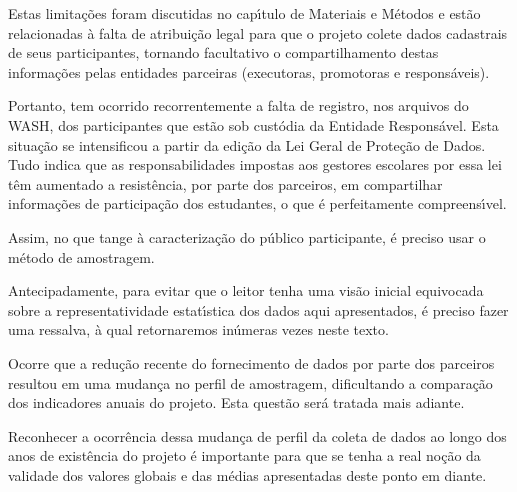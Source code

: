 \documentclass[
12pt,		%
openright,	%
twoside,  %
a4paper,			%
chapter=TITLE,		%
english,			%
french,				%
spanish,			%
brazil				%
]{USPSC-classe/USPSC}
\begin{document}
Estas limita\c{c}\~oes foram discutidas no cap\'{\i}tulo de Materiais e M\'etodos e est\~ao relacionadas \`a falta de atribui\c{c}\~ao legal para que o projeto colete dados cadastrais de seus participantes, tornando facultativo o compartilhamento destas informa\c{c}\~oes pelas entidades parceiras (executoras, promotoras e respons\'aveis).









Portanto, tem ocorrido recorrentemente a falta de registro, nos arquivos do WASH, dos participantes que est\~ao sob cust\'odia da Entidade Respons\'avel. Esta situa\c{c}\~ao se intensificou a partir da edi\c{c}\~ao da Lei Geral de Prote\c{c}\~ao de Dados. Tudo indica que as responsabilidades impostas aos gestores escolares por essa lei t\^em aumentado a  resist\^encia, por parte dos parceiros, em compartilhar informa\c{c}\~oes de participa\c{c}\~ao dos estudantes, o que \'e perfeitamente compreens\'{\i}vel.









Assim, no que tange \`a caracteriza\c{c}\~ao do p\'ublico participante, \'e preciso usar o m\'etodo de amostragem.









Antecipadamente, para evitar que o leitor tenha uma vis\~ao inicial equivocada sobre a representatividade estat\'{\i}stica dos dados aqui apresentados, \'e preciso fazer uma ressalva, \`a qual retornaremos in\'umeras vezes neste texto.









Ocorre que a redu\c{c}\~ao recente do fornecimento de dados por parte dos parceiros resultou em uma mudan\c{c}a no perfil de amostragem, dificultando a compara\c{c}\~ao dos indicadores anuais do projeto. Esta quest\~ao ser\'a tratada mais adiante.









Reconhecer a ocorr\^encia dessa mudan\c{c}a de perfil da coleta de dados ao longo dos anos de exist\^encia do projeto \'e importante para que se tenha a real no\c{c}\~ao da validade dos valores globais e das m\'edias apresentadas deste ponto em diante.
\end{document}

